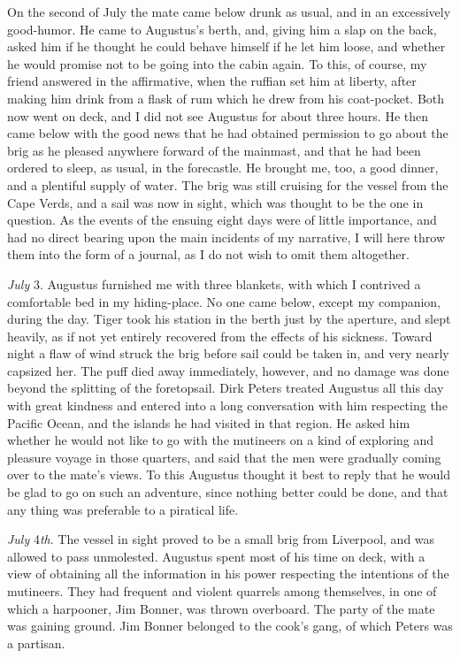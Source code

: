 On the second of July the mate came below drunk as usual, and in an
excessively good-humor. He came to Augustus's berth, and, giving him a slap on
the back, asked him if he thought he could behave himself if he let him loose,
and whether he would promise not to be going into the cabin again. To this, of
course, my friend answered in the affirmative, when the ruffian set him at
liberty, after making him drink from a flask of rum which he drew from his
coat-pocket. Both now went on deck, and I did not see Augustus for about three
hours. He then came below with the good news that he had obtained permission to
go about the brig as he pleased anywhere forward of the mainmast, and that he
had been ordered to sleep, as usual, in the forecastle. He brought me, too, a
good dinner, and a plentiful supply of water. The brig was still cruising for
the vessel from the Cape Verds, and a sail was now in sight, which was thought
to be the one in question. As the events of the ensuing eight days were of
little importance, and had no direct bearing upon the main incidents of my
narrative, I will here throw them into the form of a journal, as I do not wish
to omit them altogether. 

\emph{July} 3. Augustus furnished me with three blankets, with which I
contrived a comfortable bed in my hiding-place. No one came below, except my
companion, during the day. Tiger took his station in the berth just by the
aperture, and slept heavily, as if not yet entirely recovered from the effects
of his sickness. Toward night a flaw of wind struck the brig before sail could
be taken in, and very nearly capsized her. The puff died away immediately,
however, and no damage was done beyond the splitting of the foretopsail. Dirk
Peters treated Augustus all this day with great kindness and entered into a long
conversation with him respecting the Pacific Ocean, and the islands he had
visited in that region. He asked him whether he would not like to go with the
mutineers on a kind of exploring and pleasure voyage in those quarters, and said
that the men were gradually coming over to the mate's views. To this Augustus
thought it best to reply that he would be glad to go on such an adventure, since
nothing better could be done, and that any thing was preferable to a piratical
life. 

\emph{July} 4\emph{th}. The vessel in sight proved to be a small brig from
Liverpool, and was allowed to pass unmolested. Augustus spent most of his time
on deck, with a view of obtaining all the information in his power respecting
the intentions of the mutineers. They had frequent and violent quarrels among
themselves, in one of which a harpooner, Jim Bonner, was thrown overboard. The
party of the mate was gaining ground. Jim Bonner belonged to the cook's gang, of
which Peters was a partisan. 

